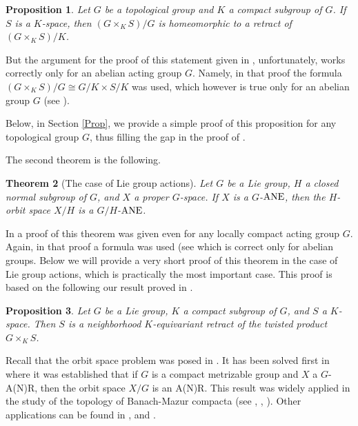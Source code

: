 \documentclass{amsart}
\newtheorem{theorem}{Theorem}[section]
\newtheorem{proposition}[theorem]{Proposition}
\begin{document}
        
 \begin{proposition}\label{retractdirect}
 Let $G$ be a topological group and $K$ a  compact subgroup of  $G$. If $S$ is a $K$-space, then 
 $({G \times_K S})/G$ is homeomorphic to a retract of  $({G \times_K S})/K$.
 \end{proposition}
 
But the argument for the proof of this statement  given in \cite[Theorem 6.4]{ant:99},  unfortunately,  works correctly only for an abelian acting group $G$.  Namely,  in  that  proof 
 the formula  $(G \times_K S)/G\cong G/K\times S/K$ was used,  which however is true only for an abelian group $G$ (see \cite[Proposition 2]{ant:99}).
 
  Below, in Section \ref{Prop}, we provide a simple proof of this proposition for any topological  group $G$, thus filling the gap in the proof  of \cite[Theorem 6.4]{ant:99}.
 
 \medskip
  
 The second theorem is the following.
 
   \begin{theorem}[The case of Lie group actions]\label{T:00} Let $G$ be a Lie  group,  $H$  a closed normal subgroup of $G$, and $X$   a proper $G$-space. If 
 $X$ is a $G$-${\rm ANE}$, then the $H$-orbit space  $X/H$ is a $G/H$-${\rm ANE}$. 

\end{theorem} 

 In \cite[Theorem 1.1]{ant:proper}      a proof  of this theorem was given even for  any locally compact acting group $G$. Again, in that proof a formula was used (see \cite[formula (3.3)]{ant:proper} which is correct only for abelian groups. Below we will provide a very short proof of this theorem in the case of Lie group actions, which is practically the most important case.
 This proof is based on the following our result  proved 
 in \cite[Proposition 4.1]{ant:proper}.
  
  \begin{proposition}\label{P:1} Let $G$ be a Lie  group, $K$ a compact   subgroup of $G$, and $S$  a $K$-space. Then $S$ is a neighborhood $K$-equivariant retract of the twisted product $G\times_K S$.
\end{proposition}    
        \medskip
  
  


Recall that the orbit space problem was  posed in \cite[Question 4]{ant:aspects}. It has been  solved first 
 in \cite[Theorem 8]{ant:88} where it was established that if $G$ is a compact metrizable group and $X$  a $G$-A(N)R, then the orbit space $X/G$ is an A(N)R. 
 This result was widely applied in the study of the topology of  Banach-Mazur compacta  (see \cite{ant:98}, \cite{ant:00}, \cite{ant:03}).  Other applications  can be found in \cite{ant:88}, \cite{bas:94} and \cite{zhur:90}.
\end{document}
